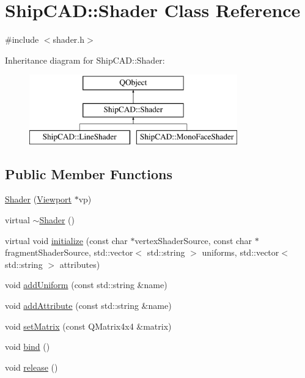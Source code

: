 \hypertarget{classShipCAD_1_1Shader}{\section{Ship\-C\-A\-D\-:\-:Shader Class Reference}
\label{classShipCAD_1_1Shader}
}


{\ttfamily \#include $<$shader.\-h$>$}

Inheritance diagram for Ship\-C\-A\-D\-:\-:Shader\-:\begin{figure}[H]
\begin{center}
\leavevmode
\includegraphics[height=3.000000cm]{classShipCAD_1_1Shader}
\end{center}
\end{figure}
\subsection*{Public Member Functions}
\begin{DoxyCompactItemize}
\item 
\hyperlink{classShipCAD_1_1Shader_a36bc24054e22fb965b04dae9a2b76eb7}{Shader} (\hyperlink{classShipCAD_1_1Viewport}{Viewport} $\ast$vp)
\item 
virtual \hyperlink{classShipCAD_1_1Shader_aff01df87e8a102f270b5b135a295e59d}{$\sim$\-Shader} ()
\item 
virtual void \hyperlink{classShipCAD_1_1Shader_a011fae279e362f548e8c4e4b35b7291e}{initialize} (const char $\ast$vertex\-Shader\-Source, const char $\ast$fragment\-Shader\-Source, std\-::vector$<$ std\-::string $>$ uniforms, std\-::vector$<$ std\-::string $>$ attributes)
\item 
void \hyperlink{classShipCAD_1_1Shader_ac8faec958f9d5806510d39be5f512c8e}{add\-Uniform} (const std\-::string \&name)
\item 
void \hyperlink{classShipCAD_1_1Shader_a6a298be357d7860d859aedbe397b81b9}{add\-Attribute} (const std\-::string \&name)
\item 
void \hyperlink{classShipCAD_1_1Shader_a7d7fe16e4eb06ad1eb19e22b38cff96e}{set\-Matrix} (const Q\-Matrix4x4 \&matrix)
\item 
void \hyperlink{classShipCAD_1_1Shader_a00c06ead1e413d5d5ecbced82478f753}{bind} ()
\item 
void \hyperlink{classShipCAD_1_1Shader_a0f41d7628964320846101cf5938a928e}{release} ()
\end{DoxyCompactItemize}
